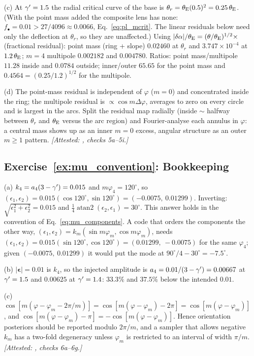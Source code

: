 (c) At $\gamma'=1.5$ the radial critical curve of the base is
$\theta_r = \theta_{\mathrm{E}}(0.5)^2 = 0.25\,\theta_{\mathrm{E}}$.  (With the point mass added
the composite lens has none: $f_\bullet = 0.01 > 27/4096 \approx 0.0066$,
Eq.~\eqref{eq:pl_mcrit}.  The linear residuals below need only the
deflection at $\theta_r$, so they are unaffected.)  Using
$|\delta\alpha|/\theta_{\mathrm{E}} = (\theta/\theta_{\mathrm{E}})^{1/2}\times$(fractional
residual): point mass (ring + slope) $0.02460$ at $\theta_r$ and
$3.747\times10^{-4}$ at $1.2\,\theta_{\mathrm{E}}$; $m=4$ multipole
$0.002182$ and $0.004780$.  Ratios: point mass/multipole $11.28$
inside and $0.0784$ outside; inner/outer $65.65$ for the point mass and
$0.4564 = (0.25/1.2)^{1/2}$ for the multipole.

(d) The point-mass residual is independent of $\varphi$ ($m=0$)
and concentrated inside the ring; the multipole residual is
$\propto\cos m\Delta\varphi$, averages to zero on every circle and is
largest in the arcs.  Split the residual map radially (inside $\sim$
halfway between $\theta_r$ and $\theta_{\mathrm{E}}$ versus the arc region) and
Fourier-analyse each annulus in $\varphi$: a central mass shows up as an
inner $m=0$ excess, angular structure as an outer $m\ge1$ pattern.
\emph{[Attested: ,
checks 5a--5i.]}

\subsection*{Exercise~\ref{ex:mu_convention}: Bookkeeping}

(a) $k_4 = a_4(3-\gamma') = 0.015$ and $m\varphi_4 = 120^\circ$, so
$(\epsilon_1,\epsilon_2) = 0.015(\cos120^\circ,\sin120^\circ)
= (-0.0075,\ 0.01299)$.  Inverting: $\sqrt{\epsilon_1^2+\epsilon_2^2}
= 0.015$ and $\tfrac14\operatorname{atan2}(\epsilon_2,\epsilon_1) =
30^\circ$.  This answer holds in the convention of
Eq.~\eqref{eq:mu_components}.  A code that orders the components the
other way, $(\epsilon_1,\epsilon_2) = k_m(\sin m\varphi_m,\cos
m\varphi_m)$, needs $(\epsilon_1,\epsilon_2) = 0.015(\sin120^\circ,
\cos120^\circ) = (0.01299,\ -0.0075)$ for the same $\varphi_4$; given
$(-0.0075,\ 0.01299)$ it would put the mode at $90^\circ/4 - 30^\circ =
-7.5^\circ$.

(b) $|\boldsymbol\epsilon| = 0.01$ is $k_4$, so the injected
amplitude is $a_4 = 0.01/(3-\gamma') = 0.00667$ at $\gamma'=1.5$ and $0.00625$
at $\gamma'=1.4$: $33.3\%$ and $37.5\%$ below the intended $0.01$.

(c) $\cos[m(\varphi-\varphi_m-2\pi/m)] =
\cos[m(\varphi-\varphi_m)-2\pi] = \cos[m(\varphi-\varphi_m)]$, and
$\cos[m(\varphi-\varphi_m)-\pi] = -\cos[m(\varphi-\varphi_m)]$.  Hence
orientation posteriors should be reported modulo $2\pi/m$, and a
sampler that allows negative $k_m$ has a two-fold degeneracy unless
$\varphi_m$ is restricted to an interval of width $\pi/m$.
\emph{[Attested: ,
checks 6a--6g.]}

